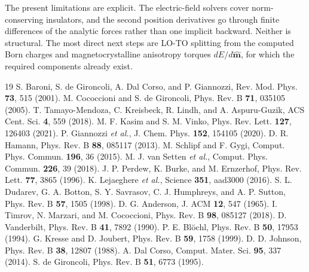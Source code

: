 \documentclass[11pt,twocolumn]{article}
\begin{document}
The present limitations are explicit. The electric-field solvers cover
norm-conserving insulators, and the second position derivatives go
through finite differences of the analytic forces rather than one
implicit backward. Neither is structural. The most direct next
steps are LO-TO splitting from the computed Born charges and
magnetocrystalline anisotropy torques $dE/d\hat{\mathbf{m}}$, for which
the required components already exist.

\begin{thebibliography}{19}
 S. Baroni, S. de Gironcoli, A. Dal Corso, and
P. Giannozzi, Rev. Mod. Phys. \textbf{73}, 515 (2001).
 M. Cococcioni and S. de Gironcoli, Phys. Rev. B
\textbf{71}, 035105 (2005).
 T. Tamayo-Mendoza, C. Kreisbeck, R. Lindh, and
A. Aspuru-Guzik, ACS Cent. Sci. \textbf{4}, 559 (2018).
 M. F. Kasim and S. M. Vinko, Phys. Rev. Lett.
\textbf{127}, 126403 (2021).
 P. Giannozzi \textit{et al.}, J. Chem. Phys.
\textbf{152}, 154105 (2020).
 D. R. Hamann, Phys. Rev. B \textbf{88}, 085117 (2013).
 M. Schlipf and F. Gygi, Comput. Phys. Commun.
\textbf{196}, 36 (2015).
 M. J. van Setten \textit{et al.}, Comput. Phys.
Commun. \textbf{226}, 39 (2018).
 J. P. Perdew, K. Burke, and M. Ernzerhof, Phys. Rev.
Lett. \textbf{77}, 3865 (1996).
 K. Lejaeghere \textit{et al.}, Science
\textbf{351}, aad3000 (2016).
 S. L. Dudarev, G. A. Botton, S. Y. Savrasov,
C. J. Humphreys, and A. P. Sutton, Phys. Rev. B \textbf{57}, 1505 (1998).
 D. G. Anderson, J. ACM \textbf{12}, 547 (1965).
 I. Timrov, N. Marzari, and M. Cococcioni, Phys. Rev.
B \textbf{98}, 085127 (2018).
 D. Vanderbilt, Phys. Rev. B \textbf{41}, 7892
(1990).
 P. E. Bl\"ochl, Phys. Rev. B \textbf{50}, 17953
(1994).
 G. Kresse and D. Joubert, Phys. Rev. B \textbf{59},
1758 (1999).
 D. D. Johnson, Phys. Rev. B \textbf{38}, 12807
(1988).
 A. Dal Corso, Comput. Mater. Sci. \textbf{95}, 337
(2014).
 S. de Gironcoli, Phys. Rev. B \textbf{51}, 6773
(1995).
\end{thebibliography}
\end{document}
